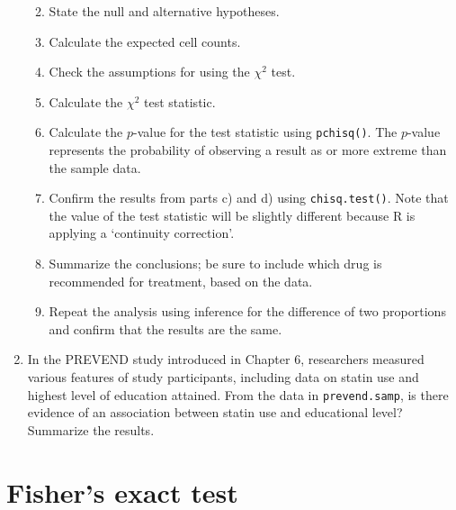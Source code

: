 \documentclass[letterpaper,12pt,twoside,]{pinp}
\begin{document}
\begin{enumerate}
  \begin{enumerate}
  \def\labelenumii{\alph{enumii})}
  \item
    State the null and alternative hypotheses.
  \item
    Calculate the expected cell counts.
  \item
    Check the assumptions for using the \(\chi^2\) test.
  \item
    Calculate the \(\chi^2\) test statistic.
  \item
    Calculate the \(p\)-value for the test statistic using
    \texttt{pchisq()}. The \(p\)-value represents the probability of
    observing a result as or more extreme than the sample data.
  \item
    Confirm the results from parts c) and d) using
    \texttt{chisq.test()}. Note that the value of the test statistic
    will be slightly different because \textsf{R} is applying a
    `continuity correction'.
  \item
    Summarize the conclusions; be sure to include which drug is
    recommended for treatment, based on the data.
  \item
    Repeat the analysis using inference for the difference of two
    proportions and confirm that the results are the same.
  \end{enumerate}
\item
  In the PREVEND study introduced in Chapter 6, researchers measured
  various features of study participants, including data on statin use
  and highest level of education attained. From the data in
  \texttt{prevend.samp}, is there evidence of an association between
  statin use and educational level? Summarize the results.
\end{enumerate}

\hypertarget{fishers-exact-test}{%
\section{Fisher's exact test}\label{fishers-exact-test}}
\end{document}
